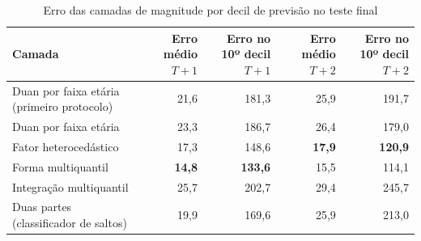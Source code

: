 \documentclass[article, 12pt, oneside, a4paper, english, brazil, section=TITLE]{abntex2}
\begin{document}
\begin{table}[htbp]
  \caption{Erro das camadas de magnitude por decil de previsão no teste final}
  \label{tab:magnitude}
  \begin{tabularx}{\textwidth}{Lrrrr}
    \toprule
    Camada & Erro médio $T+1$ & Erro no 10º decil $T+1$ & Erro médio $T+2$ & Erro no 10º decil $T+2$ \\
    \midrule
    Duan por faixa etária (primeiro protocolo) & 21,6 & 181,3 & 25,9 & 191,7 \\
    Duan por faixa etária & 23,3 & 186,7 & 26,4 & 179,0 \\
    Fator heterocedástico & 17,3 & 148,6 & \textbf{17,9} & \textbf{120,9} \\
    Forma multiquantil & \textbf{14,8} & \textbf{133,6} & 15,5 & 114,1 \\
    Integração multiquantil & 25,7 & 202,7 & 29,4 & 245,7 \\
    Duas partes (classificador de saltos) & 19,9 & 169,6 & 25,9 & 213,0 \\
    \bottomrule
  \end{tabularx}
\end{table}
\end{document}
